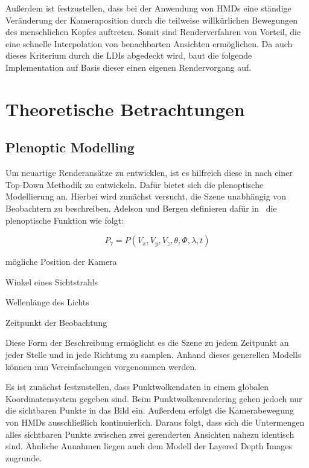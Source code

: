 \documentclass[hyperref, beleg, german]{cgvpub}
\begin{document}
Außerdem ist festzustellen, dass bei der Anwendung von HMDs eine ständige
Veränderung der Kameraposition durch die teilweise willkürlichen Bewegungen des
menschlichen Kopfes auftreten. Somit sind Renderverfahren von Vorteil, die eine
schnelle Interpolation von benachbarten Ansichten ermöglichen. Da auch dieses
Kriterium durch die LDIs abgedeckt wird, baut die folgende Implementation auf
Basis dieser einen eigenen Rendervorgang auf.

\chapter{Theoretische Betrachtungen}

\section{Plenoptic Modelling}

Um neuartige Renderansätze zu entwicklen, ist es hilfreich diese in nach einer
Top-Down Methodik zu entwickeln. Dafür bietet sich die plenoptische Modellierung
an. Hierbei wird zunächst versucht, die Szene unabhängig von Beobachtern zu
beschreiben. Adelson und Bergen definieren dafür in~\cite{adelson1991plenoptic}
die plenoptische Funktion wie folgt:

\begin{equation}
	P_7 = P(V_x, V_y, V_z, \theta, \Phi, \lambda, t)
\end{equation}

\begin{description}[style=sameline]
	\item[\( V_x, V_y, V_z \)] mögliche Position der Kamera
	\item[\( \theta, \Phi \)] Winkel eines Sichtstrahls
	\item[\( \lambda \)] Wellenlänge des Lichts
	\item[\( t \)] Zeitpunkt der Beobachtung
\end{description}

Diese Form der Beschreibung ermöglicht es die Szene zu jedem Zeitpunkt an jeder
Stelle und in jede Richtung zu samplen. Anhand dieses generellen Modells können
nun Vereinfachungen vorgenommen werden.

Es ist zunächst festzustellen, dass Punktwolkendaten in einem globalen
Koordinatensystem gegeben sind. Beim Punktwolkenrendering gehen jedoch nur die
sichtbaren Punkte in das Bild ein. Außerdem erfolgt die Kamerabewegung von HMDs
ausschließlich kontinuierlich. Daraus folgt, dass sich die Untermengen alles
sichtbaren Punkte zwischen zwei gerenderten Ansichten nahezu identisch sind.
Ähnliche Annahmen liegen auch dem Modell der Layered Depth Images zugrunde.
\end{document}
